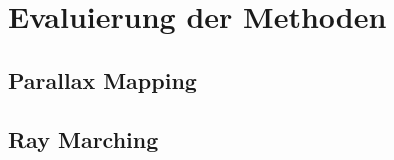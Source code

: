 \section{Evaluierung der Methoden}
\noindent

\subsection{Parallax Mapping}
\subsection{Ray Marching}